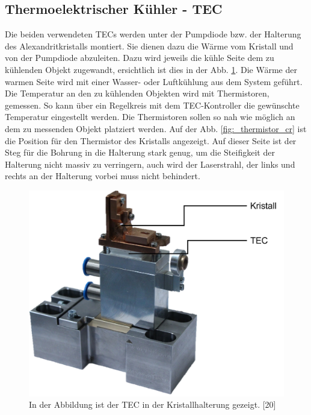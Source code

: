 \subsection{Thermoelektrischer Kühler - TEC}
Die beiden verwendeten TECs werden unter der Pumpdiode bzw. der Halterung des Alexandritkristalls montiert. Sie dienen dazu die Wärme vom Kristall und von der Pumpdiode abzuleiten. Dazu wird jeweils die kühle Seite dem zu kühlenden Objekt zugewandt, ersichtlich ist dies in der Abb. \ref{fig:_tec_cr_hw}. Die Wärme der warmen Seite wird mit einer Wasser- oder Luftkühlung aus dem System geführt. Die Temperatur an den zu kühlenden Objekten wird mit Thermistoren, gemessen. So kann über ein Regelkreis mit dem TEC-Kontroller die gewünschte Temperatur eingestellt werden. Die Thermistoren sollen so nah wie möglich an dem zu messenden Objekt platziert werden. Auf der Abb. \ref{fig:_thermistor_cr} ist die Position für den Thermistor des Kristalls angezeigt. Auf dieser Seite ist der Steg für die Bohrung in die Halterung stark genug, um die Steifigkeit der Halterung nicht massiv zu verringern, auch wird der Laserstrahl, der links und rechts an der Halterung vorbei muss nicht behindert.

\begin{figure}[H]
    \centering
    \includegraphics[scale=0.5]{98_images/real_front_desc.png}
    \caption{In der Abbildung ist der TEC in der Kristallhalterung gezeigt. [20]}
    \label{fig:_tec_cr_hw}
\end{figure}

